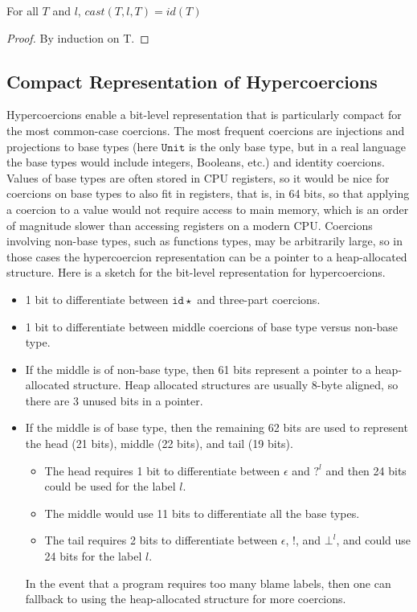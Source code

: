 \documentclass[acmsmall,review,anonymous]{acmart}\settopmatter{printfolios=true,printccs=false,printacmref=false}
\newcommand{\lazyUD}{Lazy\;UD}
\newcommand{\POOunit}[0]{\mathtt{Unit}}
\newcommand{\hyperCoercionI}[0]{\mathtt{id\star}}
\begin{document}
\begin{proposition}[\lazyUD{} Identity Casts]
  For all $T$ and $l$, $cast(T,l,T) = id(T) $
\end{proposition}
\begin{proof}
  By induction on T.
\end{proof}


\subsection{Compact Representation of Hypercoercions}

Hypercoercions enable a bit-level representation that is particularly
compact for the most common-case coercions. The most frequent
coercions are injections and projections to base types (here
$\POOunit$ is the only base type, but in a real language the base
types would include integers, Booleans, etc.) and identity coercions.
Values of base types are often stored in CPU registers, so it would be
nice for coercions on base types to also fit in registers, that is, in
64 bits, so that applying a coercion to a value would not require
access to main memory, which is an order of magnitude slower than
accessing registers on a modern CPU.
%
Coercions involving non-base types, such as functions types,
may be arbitrarily large, so in those cases the hypercoercion
representation can be a pointer to a heap-allocated structure.  Here
is a sketch for the bit-level representation for hypercoercions.

\begin{itemize}
\item 1 bit to differentiate between $\hyperCoercionI$
  and three-part coercions.

\item 1 bit to differentiate between middle coercions of base type
  versus non-base type.

\item If the middle is of non-base type, then 61 bits represent a
  pointer to a heap-allocated structure. Heap allocated structures are
  usually 8-byte aligned, so there are 3 unused bits in a pointer.

\item If the middle is of base type, then the remaining 62 bits are
  used to represent the head (21 bits), middle (22 bits), and tail (19
  bits).
  \begin{itemize}
  \item The head requires 1 bit to differentiate between $\epsilon$
    and $?^l$ and then 24 bits could be used for the label $l$.
  \item The middle would use 11 bits to differentiate all the base types.
  \item The tail requires 2 bits to differentiate between $\epsilon$,
    $!$, and $\bot^l$, and could use 24 bits for the label $l$.
  \end{itemize}
  In the event that a program requires too many blame labels, then one
  can fallback to using the heap-allocated structure for more
  coercions.
\end{itemize}
  
\end{document}
